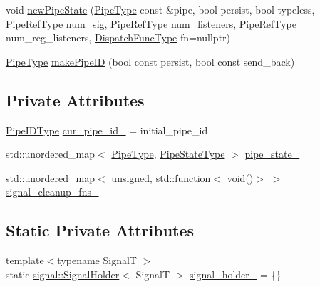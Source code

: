 \begin{DoxyCompactItemize}
\item 
void \hyperlink{structvt_1_1pipe_1_1_pipe_manager_base_a835a8b819cfe7100b723b6d9b22cca57}{new\+Pipe\+State} (\hyperlink{namespacevt_ac9852acda74d1896f48f406cd72c7bd3}{Pipe\+Type} const \&pipe, bool persist, bool typeless, \hyperlink{namespacevt_ace18d74dd489d9ea506d38789fffce34}{Pipe\+Ref\+Type} num\+\_\+sig, \hyperlink{namespacevt_ace18d74dd489d9ea506d38789fffce34}{Pipe\+Ref\+Type} num\+\_\+listeners, \hyperlink{namespacevt_ace18d74dd489d9ea506d38789fffce34}{Pipe\+Ref\+Type} num\+\_\+reg\+\_\+listeners, \hyperlink{structvt_1_1pipe_1_1_pipe_manager_base_a983e301505317c5ba2041461e7dec84a}{Dispatch\+Func\+Type} fn=nullptr)
\item 
\hyperlink{namespacevt_ac9852acda74d1896f48f406cd72c7bd3}{Pipe\+Type} \hyperlink{structvt_1_1pipe_1_1_pipe_manager_base_af1ba11407837cb69b4d205dd7ba880b0}{make\+Pipe\+ID} (bool const persist, bool const send\+\_\+back)
\end{DoxyCompactItemize}
\subsection*{Private Attributes}
\begin{DoxyCompactItemize}
\item 
\hyperlink{namespacevt_1_1pipe_a8aa7908de242917ac0922b9e9c85fea4}{Pipe\+I\+D\+Type} \hyperlink{structvt_1_1pipe_1_1_pipe_manager_base_a32f19829aa6cfffde5820b927fc326c9}{cur\+\_\+pipe\+\_\+id\+\_\+} = initial\+\_\+pipe\+\_\+id
\item 
std\+::unordered\+\_\+map$<$ \hyperlink{namespacevt_ac9852acda74d1896f48f406cd72c7bd3}{Pipe\+Type}, \hyperlink{structvt_1_1pipe_1_1_pipe_manager_base_a1364798bda487c9fb04879599f96c507}{Pipe\+State\+Type} $>$ \hyperlink{structvt_1_1pipe_1_1_pipe_manager_base_ab75d5e22880b1bb14a459fdb1147a0e6}{pipe\+\_\+state\+\_\+}
\item 
std\+::unordered\+\_\+map$<$ unsigned, std\+::function$<$ void()$>$ $>$ \hyperlink{structvt_1_1pipe_1_1_pipe_manager_base_a911580408d9a2425c5c8cef0b5002612}{signal\+\_\+cleanup\+\_\+fns\+\_\+}
\end{DoxyCompactItemize}
\subsection*{Static Private Attributes}
\begin{DoxyCompactItemize}
\item 
{\footnotesize template$<$typename SignalT $>$ }\\static \hyperlink{structvt_1_1pipe_1_1signal_1_1_signal_holder}{signal\+::\+Signal\+Holder}$<$ SignalT $>$ \hyperlink{structvt_1_1pipe_1_1_pipe_manager_base_a0c85d01e4f6a9bd90056a8745b255c6d}{signal\+\_\+holder\+\_\+} = \{\}
\end{DoxyCompactItemize}
